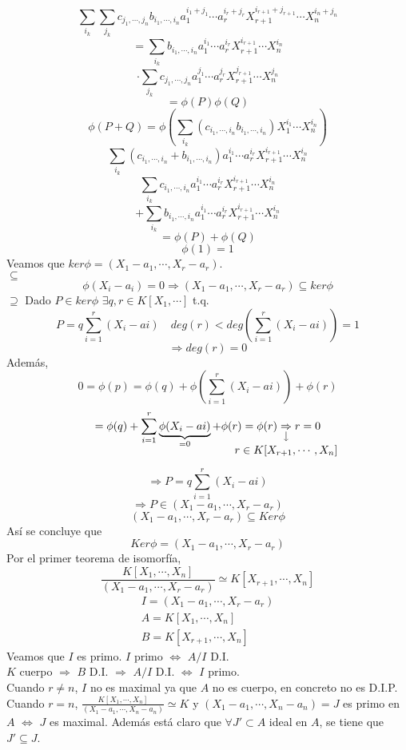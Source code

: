 \documentclass{article}
\newcommand{\nota}[3][2ex]{
    \underset{\mathclap{
        \begin{tikzpicture}
          \draw[<-] (0, 0) to ++(0,#1);
          \node[below] at (0,0) {#3};
        \end{tikzpicture}}}{#2}
}
\begin{document}
\begin{multicols}{2}
$$$$
$$
\sum_{i_k} \sum_{j_k} c_{j_1,\cdots,j_n} b_{i_1,\cdots,i_n} a_1^{i_1+j_1}\cdots a_r^{i_r+j_r} X_{r+1}^{i_{r+1}+j_{r+1}}\cdots X_n^{i_n+j_n}
$$
$$
= \sum_{i_k} b_{i_1,\cdots,i_n} a_1^{i_1}\cdots a_r^{i_r} X_{r+1}^{i_{r+1}}\cdots X_n^{i_n}
$$
$$
\cdot \sum_{j_k} c_{j_1,\cdots,j_n} a_1^{j_1}\cdots a_r^{j_r} X_{r+1}^{j_{r+1}}\cdots X_n^{j_n}
$$
$$
=\phi(P)\phi(Q)
$$
$$
\phi(P+Q)= \phi \left(\sum_{i_k} \left( c_{i_1,\cdots,i_n} b_{i_1,\cdots,i_n}\right) X_1^{i_1}\cdots X_n^{i_n} \right)
$$
$$
\sum_{i_k} \left( c_{i_1,\cdots,i_n} + b_{i_1,\cdots,i_n}\right) a_1^{i_1} \cdots a_r^{i_r}X_{r+1}^{i_{r+1}}\cdots X_n^{i_n}
$$
$$
\sum_{i_k} c_{i_1,\cdots,i_n} a_1^{i_1} \cdots a_r^{i_r}X_{r+1}^{i_{r+1}}\cdots X_n^{i_n}
$$
$$
+ \sum_{i_k} b_{i_1,\cdots,i_n} a_1^{i_1} \cdots a_r^{i_r}X_{r+1}^{i_{r+1}}\cdots X_n^{i_n}
$$
$$
=\phi(P)+\phi(Q)
$$
$$
\phi(1) = 1
$$
\indent Veamos que $ker\phi = (X_1-a_1, \cdots, X_r-a_r)$.\\
\indent \indent $\boxed{\subseteq}$
$$
\phi(X_i-a_i)=0\Rightarrow (X_1-a_1, \cdots, X_r-a_r) \subseteq ker\phi
$$
\indent \indent $\boxed{\supseteq}$ Dado $P\in ker \phi$ $\exists q,r \in K[X_1,\cdots]$ t.q.
$$
P= q \sum_{i=1}^r (X_i-ai) \quad deg(r)<deg\left(\sum_{i=1}^r (X_i-ai)\right)=1
$$
$$
\Rightarrow deg(r) = 0
$$
\indent \indent Además,
$$
0= \phi(p) = \phi(q)+\phi\left(\sum_{i=1}^r (X_i-ai)\right)+\phi(r)
$$
$$
= \phi(q)+\sum_{i=1}^r \underbrace{\phi(X_i-ai)}_{=0}+\phi(r)=\phi(r)
\nota{\Rightarrow}{\text{$r\in K[X_{r+1},\cdots,X_n]$}} r =0
$$
$$
\Rightarrow P= q \sum_{i=1}^r (X_i-ai)
$$
$$
\Rightarrow P\in  (X_1-a_1, \cdots, X_r-a_r)
$$
$$
(X_1-a_1, \cdots, X_r-a_r) \subseteq Ker\phi
$$
\indent \indent Así se concluye que
$$
Ker\phi = (X_1-a_1, \cdots, X_r-a_r)
$$
\indent \indent Por el primer teorema de isomorfía,
$$
\frac{K[X_1,\cdots,X_n]}{(X_1-a_1, \cdots, X_r-a_r)} \simeq K[X_{r+1}, \cdots, X
_n]
$$
$$
\begin{array}{l}
    I = (X_1-a_1, \cdots, X_r-a_r)\\
    A = K[X_1,\cdots,X_n]\\
    B = K[X_{r+1}, \cdots, X_n]
\end{array}
$$
\indent \indent Veamos que $I$ es primo. $I$ primo $\Leftrightarrow$ $A/I$ D.I.\\
\indent \indent $K$ cuerpo $\Rightarrow$ $B$ D.I. $\Rightarrow$ $A/I$ D.I. $\Leftrightarrow$ $I$ primo.\\
\indent \indent Cuando $r\ne n$, $I$ no es maximal ya que $A$ no \indent \indent es cuerpo, en concreto no es D.I.P.\\
\indent \indent Cuando $r=n$, $\frac{K[X_1,\cdots,X_n]}{(X_1-a_1, \cdots, X_n-a_n)} \simeq K$ y \indent \indent $(X_1-a_1, \cdots, X_n-a_n)=J$ es primo en \indent \indent $A$ $\Leftrightarrow$ $J$ es maximal. Además está claro que \indent \indent $\forall J'\subset A$ ideal en $A$, se tiene que $J'\subseteq J$.

\end{multicols}
\end{document}
